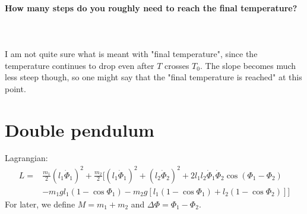 \documentclass[11 pt]{article}
\begin{document}
    \paragraph{How many steps do you roughly need to reach the final 
    temperature?} \ \\ 
    \\
        I am not quite sure what is meant with "final temperature",
        since the temperature continues to drop even after $T$ 
        crosses $T_0$. The slope becomes much less steep though, so 
        one might say that the "final temperature is reached"
        at this point.

    \newpage\noindent

    \section{Double pendulum}
        \noindent Lagrangian:
        \begin{align}
            L=
            &\frac{m_1}{2}(l_1\dot{\Phi}_1)^2+
            \frac{m_2}{2}\bigg[
                (l_1\dot{\Phi}_1)^2+
                (l_2\dot{\Phi}_2)^2+
                2l_1l_2\dot{\Phi}_1\dot{\Phi}_2\cos(\Phi_1-\Phi_2) \\
            &-m_1gl_1(1-\cos{\Phi_1})-m_2g[l_1(1-\cos{\Phi_1})+l_2(1-\cos{\Phi_2})]
            \bigg]
        \end{align}
        For later, we define $M=m_1+m_2$ and $\Delta\Phi=\Phi_1-\Phi_2$.
\end{document}
